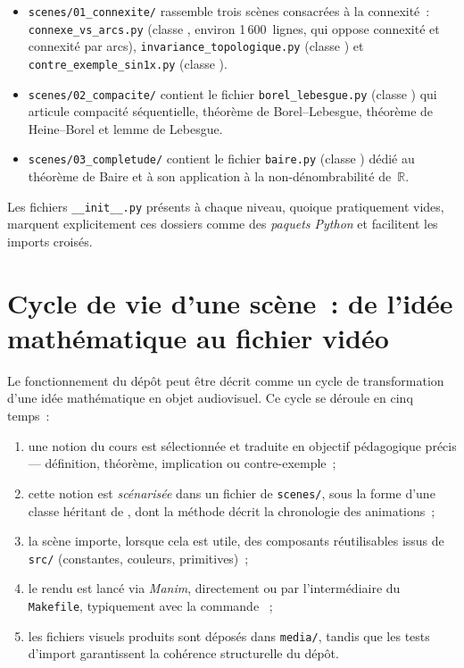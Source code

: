 \documentclass[12pt, a4paper, openany]{report}
\begin{document}
	\begin{itemize}
		\item \texttt{scenes/01\_connexite/} rassemble trois scènes consacrées à la connexité~: \texttt{connexe\_vs\_arcs.py} (classe , environ 1\,600~lignes, qui oppose connexité et connexité par arcs), \texttt{invariance\_topologique.py} (classe ) et \texttt{contre\_exemple\_sin1x.py} (classe ).
		\item \texttt{scenes/02\_compacite/} contient le fichier \texttt{borel\_lebesgue.py} (classe ) qui articule compacité séquentielle, théorème de Borel--Lebesgue, théorème de Heine--Borel et lemme de Lebesgue.
		\item \texttt{scenes/03\_completude/} contient le fichier \texttt{baire.py} (classe ) dédié au théorème de Baire et à son application à la non-dénombrabilité de~$\mathbb{R}$.
	\end{itemize}

	Les fichiers \texttt{\_\_init\_\_.py} présents à chaque niveau, quoique pratiquement vides, marquent explicitement ces dossiers comme des \emph{paquets Python} et facilitent les imports croisés.

	\section{Cycle de vie d’une scène~: de l’idée mathématique au fichier vidéo}

	Le fonctionnement du dépôt peut être décrit comme un cycle de transformation d’une idée mathématique en objet audiovisuel. Ce cycle se déroule en cinq temps~:

	\begin{enumerate}
		\item une notion du cours est sélectionnée et traduite en objectif pédagogique précis — définition, théorème, implication ou contre-exemple~;
		\item cette notion est \emph{scénarisée} dans un fichier de \texttt{scenes/}, sous la forme d’une classe héritant de , dont la méthode  décrit la chronologie des animations~;
		\item la scène importe, lorsque cela est utile, des composants réutilisables issus de \texttt{src/} (constantes, couleurs, primitives)~;
		\item le rendu est lancé via \textit{Manim}, directement ou par l’intermédiaire du \texttt{Makefile}, typiquement avec la commande ~;
		\item les fichiers visuels produits sont déposés dans \texttt{media/}, tandis que les tests d’import garantissent la cohérence structurelle du dépôt.
	\end{enumerate}
\end{document}
